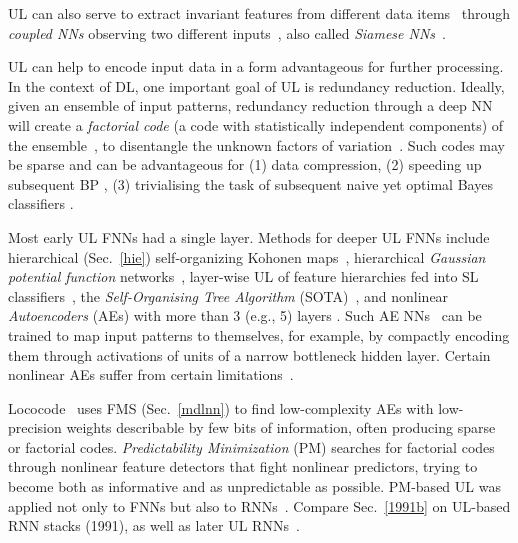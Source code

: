 \documentclass[letterpaper]{article}
\begin{document}
\begin{CJK*}{UTF8}{gbsn}
\begin{sloppypar}
UL can also serve to extract invariant features from different 
data items~\citep[e.g.,][]{Becker:91}
through {\em coupled NNs} observing two different inputs~\citep{siamese92and93},
also called {\em Siamese NNs}~\citep[e.g.,][]{bromley-93,hadsell-chopra-lecun-06,taylor2011,chen2011ieeetnn}.  

UL can help to encode
 input data in a form  advantageous for further processing. 
In the context of DL, 
one important goal of UL is redundancy reduction.
Ideally, given an ensemble of input  patterns, redundancy reduction
through a deep NN 
will create a {\em factorial code}
(a code with statistically independent components) 
of the ensemble~\citep{Barlow:89,Barlow:89review},
to disentangle the unknown factors of variation~\citep[compare][]{bengio2013tpami}.
Such codes may be sparse
and can be advantageous for 
(1) data compression, 
(2) speeding up subsequent BP \citep{Becker:91},
(3) trivialising  the task of subsequent naive yet optimal Bayes classifiers  
\citep{Schmidhuber:96ncedges}.



Most early UL FNNs had a single layer. 
Methods for deeper UL FNNs include 
hierarchical (Sec.~\ref{hie}) 
self-organizing Kohonen maps~\citep[e.g.,][]{koikkalainen1990,lampinen1992,versino1996,dittenbach2000,rauber2002},
hierarchical {\em Gaussian potential function} networks~\citep{lee1991},
layer-wise UL of feature hierarchies fed into SL 
classifiers~\citep{Behnke:IJCNN1999,Behnke:IJCNN2003}, 
the {\em Self-Organising Tree Algorithm} (SOTA)~\citep{herrero2001},
and nonlinear {\em Autoencoders} (AEs) 
with more than 3 (e.g., 5) layers
\citep{Kramer:91,Oja:91,DeMers:93}.
Such AE NNs~\citep{Rumelhart:86} can be trained to map input patterns to themselves,
for example, by  
compactly encoding them through activations of units of a narrow bottleneck hidden layer.
Certain nonlinear AEs suffer from certain limitations~\citep{baldijmlr12}.



{\sc Lococode}~\citep{Hochreiter:99nc} uses 
FMS (Sec.~\ref{mdlnn}) to
find low-complexity AEs with low-precision weights describable by 
few bits of information, often producing sparse or factorial codes.
{\em Predictability Minimization} (PM)
\citep{Schmidhuber:92ncfactorial} searches for factorial codes 
through nonlinear feature detectors that fight nonlinear predictors,
trying to become both as informative and as unpredictable as possible. 
PM-based UL was applied not only to FNNs but also to RNNs~\citep[e.g.,][]{schmidhuber1993,Steffi:93cmss}. 
Compare Sec.~\ref{1991b} on UL-based RNN stacks (1991),
as well as later UL RNNs~\citep[e.g.,][]{Klapper:01,steil2007}.


\end{sloppypar}
\end{CJK*}
\end{document}
